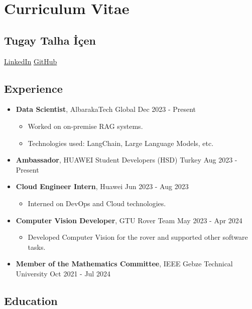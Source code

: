 \chapter*{Curriculum Vitae}

\section*{Tugay Talha İçen}
\href{https://www.linkedin.com/in/tugay-talha-icen}{LinkedIn} \quad \textbullet \quad \href{https://github.com/Tugaytalha}{GitHub}

\section*{Experience}

\begin{itemize}
    \item \textbf{Data Scientist}, AlbarakaTech Global \hfill Dec 2023 - Present
    \begin{itemize}
        \item Worked on on-premise RAG systems.
        \item Technologies used: LangChain, Large Language Models, etc.
    \end{itemize}
    \item \textbf{Ambassador}, HUAWEI Student Developers (HSD) Turkey \hfill Aug 2023 - Present
    \item \textbf{Cloud Engineer Intern}, Huawei \hfill Jun 2023 - Aug 2023
    \begin{itemize}
        \item Interned on DevOps and Cloud technologies.
    \end{itemize}
    \item \textbf{Computer Vision Developer}, GTU Rover Team \hfill May 2023 - Apr 2024
    \begin{itemize}
        \item Developed Computer Vision for the rover and supported other software tasks.
    \end{itemize}
    \item \textbf{Member of the Mathematics Committee}, IEEE Gebze Technical University \hfill Oct 2021 - Jul 2024
\end{itemize}

\section*{Education}

